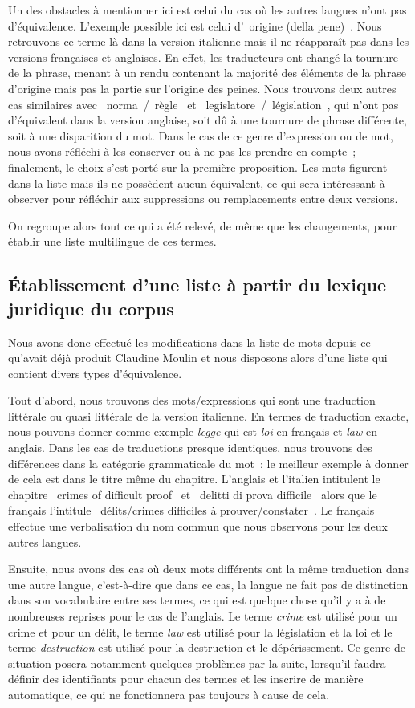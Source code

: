 Un des obstacles à mentionner ici est celui du cas où les autres langues n'ont pas d'équivalence. L'exemple possible ici est celui d'\og~origine (della pene)~\fg{}. Nous retrouvons ce terme-là dans la version italienne mais il ne réapparaît pas dans les versions françaises et anglaises. En effet, les traducteurs ont changé la tournure de la phrase, menant à un rendu contenant la majorité des éléments de la phrase d'origine mais pas la partie sur l'origine des peines. Nous trouvons deux autres cas similaires avec \og~norma~\fg{}/\og~règle~\fg{} et \og~legislatore~\fg{}/\og~législation~\fg{}, qui n'ont pas d'équivalent dans la version anglaise, soit dû à une tournure de phrase différente, soit à une disparition du mot. Dans le cas de ce genre d'expression ou de mot, nous avons réfléchi à les conserver ou à ne pas les prendre en compte~; finalement, le choix s'est porté sur la première proposition. Les mots figurent dans la liste mais ils ne possèdent aucun équivalent, ce qui sera intéressant à observer pour réfléchir aux suppressions ou remplacements entre deux versions.

On regroupe alors tout ce qui a été relevé, de même que les changements, pour établir une liste multilingue de ces termes.

\subsection{Établissement d'une liste à partir du lexique juridique du corpus}
Nous avons donc effectué les modifications dans la liste de mots depuis ce qu'avait déjà produit Claudine Moulin et nous disposons alors d'une liste qui contient divers types d'équivalence.

Tout d'abord, nous trouvons des mots/expressions qui sont une traduction littérale ou quasi littérale de la version italienne. En termes de traduction exacte, nous pouvons donner comme exemple \textit{legge} qui est \textit{loi} en français et \textit{law} en anglais. Dans les cas de traductions presque identiques, nous trouvons des différences dans la catégorie grammaticale du mot~: le meilleur exemple à donner de cela est dans le titre même du chapitre. L'anglais et l'italien intitulent le chapitre \og~crimes of difficult proof~\fg{} et \og~delitti di prova difficile~\fg{} alors que le français l'intitule \og~délits/crimes difficiles à prouver/constater~\fg{}. Le français effectue une verbalisation du nom commun que nous observons pour les deux autres langues.

Ensuite, nous avons des cas où deux mots différents ont la même traduction dans une autre langue, c'est-à-dire que dans ce cas, la langue ne fait pas de distinction dans son vocabulaire entre ses termes, ce qui est quelque chose qu'il y a à de nombreuses reprises pour le cas de l'anglais. Le terme \textit{crime} est utilisé pour un crime et pour un délit, le terme \textit{law} est utilisé pour la législation et la loi et le terme \textit{destruction} est utilisé pour la destruction et le dépérissement. Ce genre de situation posera notamment quelques problèmes par la suite, lorsqu'il faudra définir des identifiants pour chacun des termes et les inscrire de manière automatique, ce qui ne fonctionnera pas toujours à cause de cela.

